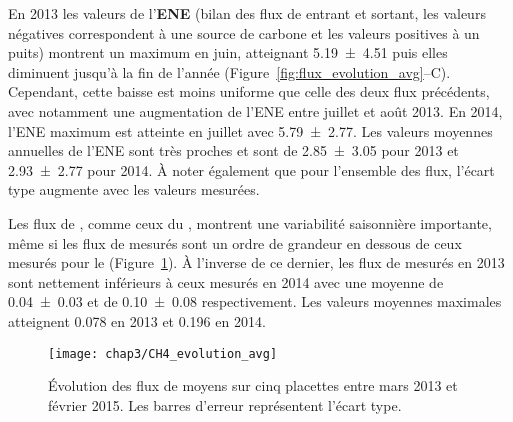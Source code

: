 En 2013 les valeurs de l'\textbf{ENE} (bilan des flux de \coo entrant et sortant, les valeurs négatives correspondent à une source de carbone et les valeurs positives à un puits) montrent un maximum en juin, atteignant \SI{5.19(451)}{\uml} puis elles diminuent jusqu'à la fin de l'année  (Figure~\ref{fig:flux_evolution_avg}--C).
Cependant, cette baisse est moins uniforme que celle des deux flux précédents, avec notamment une augmentation de l'ENE entre juillet et août 2013.
En 2014, l'ENE maximum est atteinte en juillet avec \SI{5.79(277)}{\uml}.
Les valeurs moyennes annuelles de l'ENE sont très proches et sont de \SI{2.85(305)}{\uml} pour 2013 et \SI{2.93(277)}{\uml} pour 2014.
À noter également que pour l'ensemble des flux, l'écart type augmente avec les valeurs mesurées.


Les flux de \textbf{\chh}, comme ceux du \coo, montrent une variabilité saisonnière importante, même si les flux de \chh mesurés sont un ordre de grandeur en dessous de ceux mesurés pour le \coo (Figure~\ref{fig:CH4_evolution_avg}).
À l'inverse de ce dernier, les flux de \chh mesurés en 2013 sont nettement inférieurs à ceux mesurés en 2014 avec une moyenne de \num{0.04(003)} et de \SI{0.10(008)}{\uml} respectivement.
Les valeurs moyennes maximales atteignent \num{0.078} en 2013 et \SI{0.196}{\uml} en 2014.

\begin{figure}
\centering
\texttt{[image: chap3/CH4\_evolution\_avg]}
\caption{Évolution des flux de \chh moyens sur cinq placettes entre mars 2013 et février 2015. Les barres d'erreur représentent l'écart type.}
\label{fig:CH4_evolution_avg}
\end{figure}



